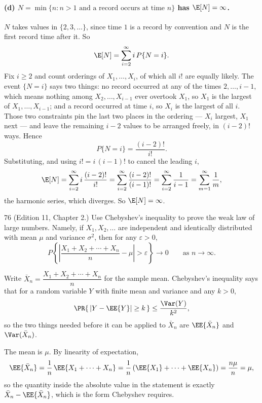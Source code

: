 \documentclass[11pt]{article}
\begin{document}
\paragraph{(d) $N = \min\{n : n > 1 \text{ and a record occurs at time } n\}$ has
$\E[N] = \infty$.}
$N$ takes values in $\{2, 3, \ldots\}$, since time $1$ is a record by convention and
$N$ is the first record time after it. So
\[
  \E[N] = \sum_{i=2}^{\infty} i\, P\{N = i\} .
\]
Fix $i \ge 2$ and count orderings of $X_1, \ldots, X_i$, of which all $i!$ are equally
likely. The event $\{N = i\}$ says two things: no record occurred at any of the times
$2, \ldots, i-1$, which means nothing among $X_2, \ldots, X_{i-1}$ ever overtook $X_1$,
so $X_1$ is the largest of $X_1, \ldots, X_{i-1}$; and a record occurred at time $i$,
so $X_i$ is the largest of all $i$. Those two constraints pin the last two places in the
ordering --- $X_i$ largest, $X_1$ next --- and leave the remaining $i-2$ values to be
arranged freely, in $(i-2)!$ ways. Hence
\[
  P\{N = i\} = \frac{(i-2)!}{i!} .
\]
Substituting, and using $i! = i\,(i-1)!$ to cancel the leading $i$,
\[
  \E[N]
    = \sum_{i=2}^{\infty} i\,\frac{(i-2)!}{i!}
    = \sum_{i=2}^{\infty} \frac{(i-2)!}{(i-1)!}
    = \sum_{i=2}^{\infty} \frac{1}{i-1}
    = \sum_{m=1}^{\infty} \frac{1}{m} ,
\]
the harmonic series, which diverges. So $\E[N] = \infty$.


\begin{problem}{76}
  (Edition 11, Chapter 2.) Use Chebyshev's inequality to prove the weak law of
  large numbers. Namely, if $X_1, X_2, \ldots$ are independent and identically
  distributed with mean $\mu$ and variance $\sigma^2$, then for any
  $\varepsilon > 0$,
  \[
    P\left\{ \left| \frac{X_1 + X_2 + \cdots + X_n}{n} - \mu \right|
             > \varepsilon \right\} \to 0
    \qquad \text{as } n \to \infty .
  \]
\end{problem}
Write $\bar{X}_{n} = \dfrac{X_{1} + X_{2} + \cdots + X_{n}}{n}$ for the sample mean.
Chebyshev's inequality says that for a random variable $Y$ with finite mean and variance
and any $k > 0$,
\[
  \PR{\,\left| Y - \EE{Y} \right| \ge k\,} \le \frac{\Var(Y)}{k^{2}} ,
\]
so the two things needed before it can be applied to $\bar{X}_{n}$ are $\EE{\bar{X}_{n}}$
and $\Var(\bar{X}_{n})$.

The mean is $\mu$. By linearity of expectation,
\[
  \EE{\bar{X}_{n}}
    = \frac{1}{n}\,\EE{X_{1} + \cdots + X_{n}}
    = \frac{1}{n}\left( \EE{X_{1}} + \cdots + \EE{X_{n}} \right)
    = \frac{n\mu}{n}
    = \mu ,
\]
so the quantity inside the absolute value in the statement is exactly
$\bar{X}_{n} - \EE{\bar{X}_{n}}$, which is the form Chebyshev requires.
\end{document}

